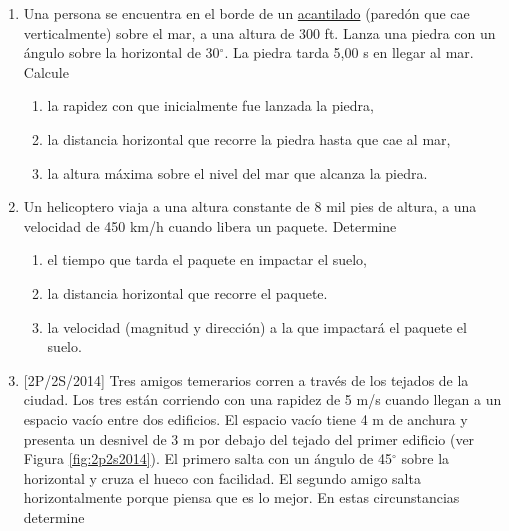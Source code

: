 \begin{enumerate}
\item Una persona se encuentra en el borde de un \href{https://viajes.nationalgeographic.com.es/a/8-acantilados-costeros-europa-que-debes-ver-vez-vida-al-menos_9637}{\textcolor{c2}{acantilado}} (paredón que cae verticalmente) sobre el mar, a una altura de 300 ft. Lanza una piedra con un \'angulo sobre la horizontal de 30$^\circ$. La piedra tarda 5,00 s en llegar al mar. Calcule
\begin{enumerate}
\item la rapidez con que inicialmente fue lanzada la piedra,
\item la distancia horizontal que recorre la piedra hasta que cae al mar,
\item la altura m\'axima sobre el nivel del mar que alcanza la piedra.
\end{enumerate}


\item  Un helicoptero viaja a una altura constante de 8 mil pies de altura, a una velocidad de 450 km/h cuando libera un paquete. Determine
\begin{enumerate}
\item el tiempo que tarda el paquete en impactar el suelo, 
\item la distancia horizontal que recorre el paquete.
\item la velocidad (magnitud y direcci\'on) a la que impactar\'a el paquete el suelo. 
\end{enumerate}
\newpage

\item \textsc{\textcolor{c2}{[2P/2S/2014]}}  \label{item:amigos} Tres amigos temerarios corren a trav\'es de los tejados de la ciudad. Los tres est\'an corriendo con una rapidez de 5 m/s cuando llegan a un espacio vac\'io entre dos edificios. El espacio vac\'io tiene 4 m de anchura y presenta un desnivel de 3 m por debajo del tejado del primer edificio (ver Figura \ref{fig:2p2s2014}). El primero salta con un \'angulo de 45$^{\circ}$ sobre la horizontal y cruza el hueco con facilidad. El segundo amigo salta horizontalmente porque piensa que es lo mejor. En estas circunstancias determine 


\end{enumerate}
